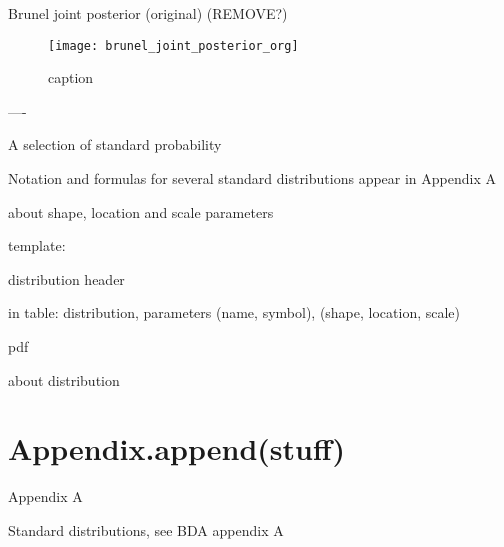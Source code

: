 Brunel joint posterior (original) (REMOVE?)

\begin{figure}[H]
    \centering
    \texttt{[image: brunel\_joint\_posterior\_org]}
    \caption{caption}
    \label{fig:fig1}
\end{figure} 

----


A selection of standard probability 

Notation and formulas for several standard distributions appear in Appendix A 


about shape, location and scale parameters

template: 

distribution header

in table: 
distribution, parameters 
(name, symbol), (shape, location, scale)

pdf

about distribution


\section{Appendix.append(stuff)}

Appendix A

Standard distributions, see BDA appendix A


